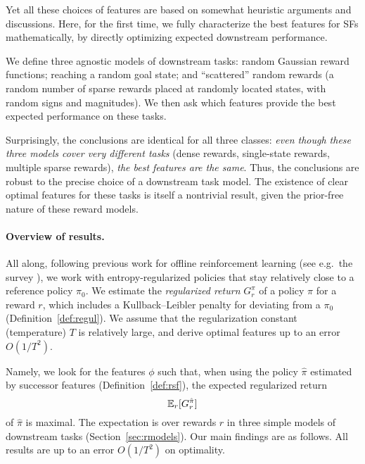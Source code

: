 \documentclass[11pt,a4paper]{article}
\begin{document}
\bigskip

Yet all these choices of features are based on somewhat heuristic
arguments and discussions. Here, for the first time, we fully
characterize the best features for SFs mathematically, by directly
optimizing expected downstream performance.

We define three agnostic models of downstream tasks: random Gaussian reward
functions; reaching a random goal state; and ``scattered'' random rewards
(a random number of sparse rewards placed at randomly located states, with random
signs and magnitudes). We then ask which features provide the best
expected performance on these tasks.

Surprisingly, the conclusions are identical for all three classes: \emph{even
though these three models cover very different tasks} (dense rewards,
single-state rewards, multiple sparse rewards), \emph{the best features are the
same}. Thus, the conclusions are robust to the precise choice of a
downstream task model. The existence of clear optimal features for these
tasks is itself a nontrivial result, given the prior-free nature of these
reward models.

\paragraph{Overview of results.} All along, following previous work for
offline reinforcement learning (see e.g.\ the survey
\cite{levine2020offline}), we work with entropy-regularized policies that
stay relatively close to a reference policy $\pi_0$.  We estimate the
\emph{regularized return} $G^{\pi}_r$ of a policy $\pi$ for a reward $r$,
which includes a Kullback--Leibler penalty for deviating from a $\pi_0$
(Definition~\ref{def:regul}).  We assume that the regularization constant
(temperature)
$T$ is relatively large, and derive optimal features up to an error
$O(1/T^2)$.

Namely, we look for the features $\phi$ such that, when using the policy $\hat \pi$ estimated by successor features (Definition~\ref{def:rsf}), the expected regularized return
\begin{equation}
\mathbb{E}_r [G^{\hat \pi}_r]
\end{equation} of $\hat \pi$ is maximal. The expectation is over rewards $r$ in three simple models of
downstream tasks (Section~\ref{sec:rmodels}). Our main findings are as follows. All results are up to
an error $O(1/T^2)$ on optimality.
\end{document}

